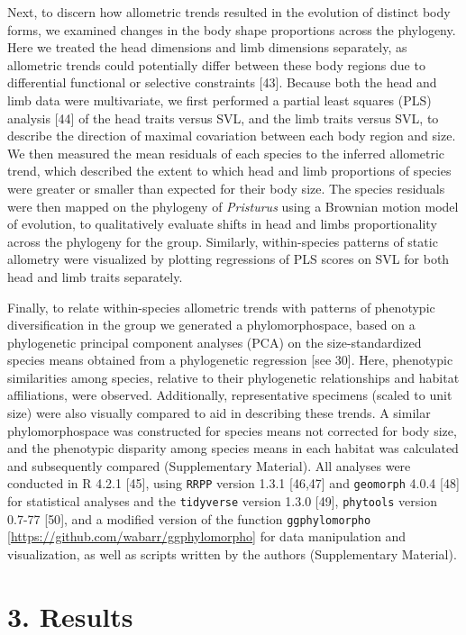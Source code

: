 \documentclass[
  11pt,
]{article}
\begin{document}
Next, to discern how allometric trends resulted in the evolution of
distinct body forms, we examined changes in the body shape proportions
across the phylogeny. Here we treated the head dimensions and limb
dimensions separately, as allometric trends could potentially differ
between these body regions due to differential functional or selective
constraints {[}43{]}. Because both the head and limb data were
multivariate, we first performed a partial least squares (PLS) analysis
{[}44{]} of the head traits versus SVL, and the limb traits versus SVL,
to describe the direction of maximal covariation between each body
region and size. We then measured the mean residuals of each species to
the inferred allometric trend, which described the extent to which head
and limb proportions of species were greater or smaller than expected
for their body size. The species residuals were then mapped on the
phylogeny of \emph{Pristurus} using a Brownian motion model of
evolution, to qualitatively evaluate shifts in head and limbs
proportionality across the phylogeny for the group. Similarly,
within-species patterns of static allometry were visualized by plotting
regressions of PLS scores on SVL for both head and limb traits
separately. \hfill\break

Finally, to relate within-species allometric trends with patterns of
phenotypic diversification in the group we generated a phylomorphospace,
based on a phylogenetic principal component analyses (PCA) on the
size-standardized species means obtained from a phylogenetic regression
{[}see 30{]}. Here, phenotypic similarities among species, relative to
their phylogenetic relationships and habitat affiliations, were
observed. Additionally, representative specimens (scaled to unit size)
were also visually compared to aid in describing these trends. A similar
phylomorphospace was constructed for species means not corrected for
body size, and the phenotypic disparity among species means in each
habitat was calculated and subsequently compared (Supplementary
Material). All analyses were conducted in R 4.2.1 {[}45{]}, using
\texttt{RRPP} version 1.3.1 {[}46,47{]} and \texttt{geomorph} 4.0.4
{[}48{]} for statistical analyses and the \texttt{tidyverse} version
1.3.0 {[}49{]}, \texttt{phytools} version 0.7-77 {[}50{]}, and a
modified version of the function \texttt{ggphylomorpho}
{[}\url{https://github.com/wabarr/ggphylomorpho}{]} for data
manipulation and visualization, as well as scripts written by the
authors (Supplementary Material).

\hypertarget{results}{%
\section{3. Results}\label{results}}
\end{document}
